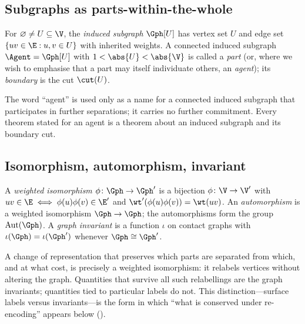 \subsection{Subgraphs as parts-within-the-whole}

\begin{definition}
\label{def:subgraph}
For $\varnothing\neq U\subseteq\V$, the \emph{induced subgraph} $\Gph[U]$ has
vertex set $U$ and edge set $\{uv\in\E : u,v\in U\}$ with inherited weights. A
connected induced subgraph $\Agent=\Gph[U]$ with $1<\abs{U}<\abs{\V}$ is called a
\emph{part} (or, where we wish to emphasise that a part may itself individuate
others, an \emph{agent}); its \emph{boundary} is the cut $\cut(U)$.
\end{definition}

\begin{remark}[Vocabulary]
\label{rem:agent-word}
The word ``agent'' is used only as a name for a connected induced subgraph that
participates in further separations; it carries no further commitment. Every
theorem stated for an agent is a theorem about an induced subgraph and its
boundary cut.
\end{remark}

\subsection{Isomorphism, automorphism, invariant}

\begin{definition}
\label{def:iso}
A \emph{weighted isomorphism} $\phi\colon\Gph\to\Gph'$ is a bijection
$\phi\colon\V\to\V'$ with $uv\in\E\iff\phi(u)\phi(v)\in\E'$ and
$\wt'(\phi(u)\phi(v))=\wt(uv)$. An \emph{automorphism} is a weighted isomorphism
$\Gph\to\Gph$; the automorphisms form the group $\mathrm{Aut}(\Gph)$. A
\emph{graph invariant} is a function $\iota$ on contact graphs with
$\iota(\Gph)=\iota(\Gph')$ whenever $\Gph\cong\Gph'$.
\end{definition}

\begin{remark}
\label{rem:reencode}
A change of representation that preserves which parts are separated from which,
and at what cost, is precisely a weighted isomorphism: it relabels vertices
without altering the graph. Quantities that survive all such relabellings are
the graph invariants; quantities tied to particular labels do not. This
distinction---surface labels versus invariants---is the form in which
``what is conserved under re-encoding'' appears below ().
\end{remark}

